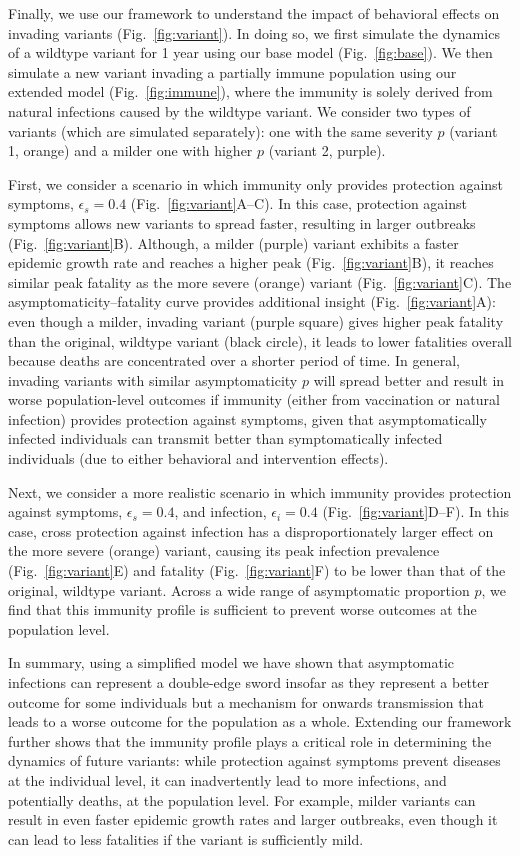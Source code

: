 \documentclass[12pt]{article}
\newcommand{\fref}[1]{Fig.~\ref{fig:#1}}
\begin{document}
Finally, we use our framework to understand the impact of behavioral effects on invading variants (\fref{variant}).
In doing so, we first simulate the dynamics of a wildtype variant for 1 year using our base model (\fref{base}).
We then simulate a new variant invading a partially immune population using our extended model (\fref{immune}), where the immunity is solely derived from natural infections caused by the wildtype variant.
We consider two types of variants (which are simulated separately): one with the same severity $p$ (variant 1, orange) and a milder one with higher $p$ (variant 2, purple).

First, we consider a scenario in which immunity only provides protection against symptoms, $\epsilon_s = 0.4$ (\fref{variant}A--C).
In this case, protection against symptoms allows new variants to spread faster, resulting in larger outbreaks (\fref{variant}B).
Although, a milder (purple) variant exhibits a faster epidemic growth rate and reaches a higher peak (\fref{variant}B), it reaches similar peak fatality as the more severe (orange) variant (\fref{variant}C).
The asymptomaticity--fatality curve provides additional insight (\fref{variant}A): even though a milder, invading variant (purple square) gives higher peak fatality than the original, wildtype variant (black circle), it leads to lower fatalities overall because deaths are concentrated over a shorter period of time.
In general, invading variants with similar asymptomaticity $p$ will spread better and result in worse population-level outcomes if immunity (either from vaccination or natural infection) provides protection against symptoms, given that asymptomatically infected individuals can transmit better than symptomatically infected individuals (due to either behavioral and intervention effects).

Next, we consider a more realistic scenario in which immunity provides protection against symptoms, $\epsilon_s = 0.4$, and infection, $\epsilon_i = 0.4$ (\fref{variant}D--F).
In this case, cross protection against infection has a disproportionately larger effect on the more severe (orange) variant, causing its peak infection prevalence (\fref{variant}E) and fatality (\fref{variant}F) to be lower than that of the original, wildtype variant.
Across a wide range of asymptomatic proportion $p$, we find that this immunity profile is sufficient to prevent worse outcomes at the population level.

In summary, using a simplified model we have shown that asymptomatic infections can represent a double-edge sword insofar as they represent a better outcome for some individuals but a mechanism for onwards transmission that leads to a worse outcome for the population as a whole.
Extending our framework further shows that the immunity profile plays a critical role in determining the dynamics of future variants:
while protection against symptoms prevent diseases at the individual level, it can inadvertently lead to more infections, and potentially deaths, at the population level.
For example, milder variants can result in even faster epidemic growth rates and larger outbreaks, even though it can lead to less fatalities if the variant is sufficiently mild.
\end{document}
